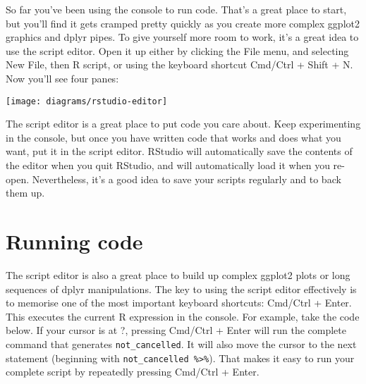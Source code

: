 \documentclass[]{book}
\newenvironment{Shaded}{\begin{snugshade}}{\end{snugshade}}
\newcommand{\KeywordTok}[1]{\textcolor[rgb]{0.13,0.29,0.53}{\textbf{{#1}}}}
\newcommand{\DataTypeTok}[1]{\textcolor[rgb]{0.13,0.29,0.53}{{#1}}}
\newcommand{\StringTok}[1]{\textcolor[rgb]{0.31,0.60,0.02}{{#1}}}
\newcommand{\NormalTok}[1]{{#1}}
\begin{document}
So far you've been using the console to run code. That's a great place
to start, but you'll find it gets cramped pretty quickly as you create
more complex ggplot2 graphics and dplyr pipes. To give yourself more
room to work, it's a great idea to use the script editor. Open it up
either by clicking the File menu, and selecting New File, then R script,
or using the keyboard shortcut Cmd/Ctrl + Shift + N. Now you'll see four
panes:

\begin{center}\texttt{[image: diagrams/rstudio-editor]} \end{center}

The script editor is a great place to put code you care about. Keep
experimenting in the console, but once you have written code that works
and does what you want, put it in the script editor. RStudio will
automatically save the contents of the editor when you quit RStudio, and
will automatically load it when you re-open. Nevertheless, it's a good
idea to save your scripts regularly and to back them up.

\section{Running code}\label{running-code}

The script editor is also a great place to build up complex ggplot2
plots or long sequences of dplyr manipulations. The key to using the
script editor effectively is to memorise one of the most important
keyboard shortcuts: Cmd/Ctrl + Enter. This executes the current R
expression in the console. For example, take the code below. If your
cursor is at ?, pressing Cmd/Ctrl + Enter will run the complete command
that generates \texttt{not\_cancelled}. It will also move the cursor to
the next statement (beginning with
\texttt{not\_cancelled\ \%\textgreater{}\%}). That makes it easy to run
your complete script by repeatedly pressing Cmd/Ctrl + Enter.

\begin{Shaded}
\end{Shaded}
\end{document}
